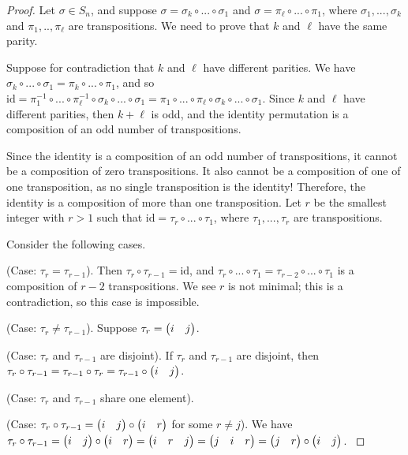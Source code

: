 \begin{proof}
    Let $\sigma \in S_n$, and suppose $\sigma = \sigma_k \circ ... \circ \sigma_1$ and $\sigma = \pi_\ell \circ ... \circ \pi_1$, where $\sigma_1, ..., \sigma_k$ and $\pi_1, .., \pi_\ell$ are transpositions. We need to prove that $k$ and $\ell$ have the same parity.
    
    Suppose for contradiction that $k$ and $\ell$ have different parities. We have $\sigma_k \circ ... \circ \sigma_1 = \pi_k \circ ... \circ \pi_1$, and so $\text{id} = \pi_1^{-1} \circ ... \circ \pi_\ell^{-1} \circ \sigma_k \circ ... \circ \sigma_1 = \pi_1 \circ ... \circ \pi_\ell \circ \sigma_k \circ ... \circ \sigma_1$. Since $k$ and $\ell$ have different parities, then  $k + \ell$ is odd, and the identity permutation is a composition of an odd number of transpositions.
    
    Since the identity is a composition of an odd number of transpositions, it cannot be a composition of zero transpositions. It also cannot be a composition of one of one transposition, as no single transposition is the identity! Therefore, the identity is a composition of more than one transposition. Let $r$ be the smallest integer with $r > 1$ such that $\text{id} = \tau_r \circ ... \circ \tau_1$, where $\tau_1, ..., \tau_r$ are transpositions.
    
    Consider the following cases.

    (Case: $\tau_r = \tau_{r - 1}$). Then $\tau_r \circ \tau_{r - 1} = \text{id}$, and $\tau_r \circ ... \circ \tau_1 = \tau_{r - 2} \circ ... \circ \tau_1$ is a composition of $r - 2$ transpositions. We see $r$ is not minimal; this is a contradiction, so this case is impossible.

    (Case: $\tau_r \neq \tau_{r - 1}$). Suppose $\tau_r = \begin{pmatrix} i & j \end{pmatrix}$.
    
    \fullindent
    {
        (Case: $\tau_r$ and $\tau_{r - 1}$ are disjoint). If $\tau_r$ and $\tau_{r - 1}$ are disjoint, then $\tau_r \circ \tau_{r - 1} = \tau_{r - 1} \circ \tau_r = \tau_{r - 1} \circ \begin{pmatrix} i & j \end{pmatrix}$.
    
        (Case: $\tau_r$ and $\tau_{r - 1}$ share one element).
    
        \fullindent
        {
            \fullindent
            {
                (Case: $\tau_r \circ \tau_{r - 1} = \begin{pmatrix} i & j \end{pmatrix} \circ \begin{pmatrix} i & r \end{pmatrix}$ for some $r \neq j$). We have $\tau_r \circ \tau_{r - 1} = \begin{pmatrix} i & j \end{pmatrix} \circ \begin{pmatrix} i & r \end{pmatrix} = \begin{pmatrix} i & r & j \end{pmatrix} = \begin{pmatrix} j & i & r \end{pmatrix} = \begin{pmatrix} j & r \end{pmatrix} \circ \begin{pmatrix} i & j \end{pmatrix}$. 
            }

}}
\end{proof}
